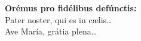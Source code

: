 \textbf{Orémus pro fidélibus defúnctis:}\\
Pater noster, qui es in c{\ae}lis\ldots\\
Ave María, grátia plena\ldots\\[1mm]
\\[1mm]
